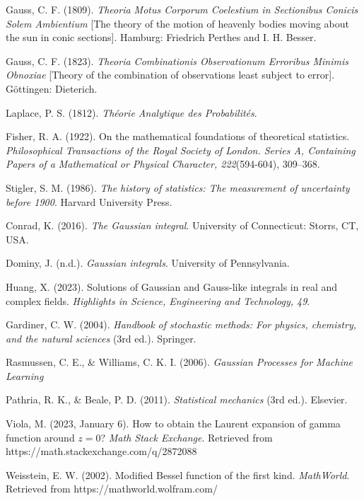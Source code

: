 \documentclass[a4paper,twoside,10pt]{article}
\begin{document}
\begin{thebibliography}{99}

 Gauss, C. F. (1809). \textit{Theoria Motus Corporum Coelestium in Sectionibus Conicis Solem Ambientium} [The theory of the motion of heavenly bodies moving about the sun in conic sections]. Hamburg: Friedrich Perthes and I. H. Besser.

 Gauss, C. F. (1823). \textit{Theoria Combinationis Observationum Erroribus Minimis Obnoxiae} [Theory of the combination of observations least subject to error]. Göttingen: Dieterich.

 Laplace, P. S. (1812). \textit{Théorie Analytique des Probabilités}.

 Fisher, R. A. (1922). On the mathematical foundations of theoretical statistics. \textit{Philosophical Transactions of the Royal Society of London. Series A, Containing Papers of a Mathematical or Physical Character, 222}(594-604), 309–368.

 Stigler, S. M. (1986). \textit{The history of statistics: The measurement of uncertainty before 1900}. Harvard University Press.

 Conrad, K. (2016). \textit{The Gaussian integral}. University of Connecticut: Storrs, CT, USA.

 Dominy, J. (n.d.). \textit{Gaussian integrals}. University of Pennsylvania.

 Huang, X. (2023). Solutions of Gaussian and Gauss-like integrals in real and complex fields. \textit{Highlights in Science, Engineering and Technology, 49}. 

 Gardiner, C. W. (2004). \textit{Handbook of stochastic methods: For physics, chemistry, and the natural sciences} (3rd ed.). Springer.

 Rasmussen, C. E., \& Williams, C. K. I. (2006). \textit{Gaussian Processes for Machine Learning}

 Pathria, R. K., \& Beale, P. D. (2011). \textit{Statistical mechanics} (3rd ed.). Elsevier.

 Viola, M. (2023, January 6). How to obtain the Laurent expansion of gamma function around \( z = 0 \)? \textit{Math Stack Exchange}. Retrieved from https://math.stackexchange.com/q/2872088

 Weisstein, E. W. (2002). Modified Bessel function of the first kind. \textit{MathWorld}. Retrieved from https://mathworld.wolfram.com/


\end{thebibliography}
\end{document}

